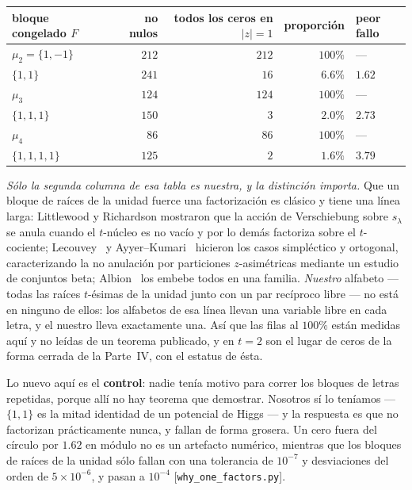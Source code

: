 \documentclass[11pt,a4paper]{article}
\begin{document}
\begin{center}\small
{}
\begin{tabular}{lrrrl}
\toprule
\rowcolor{hdrblue!14}bloque congelado $F$ & no nulos & todos los ceros en $|z|=1$ & proporción &
peor fallo\\
\midrule
$\mu_2=\{1,-1\}$ & $212$ & $212$ & $100\%$ & ---\\
$\{1,1\}$ & $241$ & $16$ & $6.6\%$ & $1.62$\\
$\mu_3$ & $124$ & $124$ & $100\%$ & ---\\
$\{1,1,1\}$ & $150$ & $3$ & $2.0\%$ & $2.73$\\
$\mu_4$ & $86$ & $86$ & $100\%$ & ---\\
$\{1,1,1,1\}$ & $125$ & $2$ & $1.6\%$ & $3.79$\\
\bottomrule
\end{tabular}
\end{center}

\noindent \emph{Sólo la segunda columna de esa tabla es nuestra, y la distinción importa.} Que un
bloque de raíces de la unidad fuerce una factorización es clásico y tiene una línea larga: Littlewood
y Richardson mostraron que la acción de Verschiebung sobre $s_\lambda$ se anula cuando el $t$-núcleo
es no vacío y por lo demás factoriza sobre el $t$-cociente; Lecouvey~\cite{Lecouvey} y
Ayyer--Kumari~\cite{AK} hicieron los casos simpléctico y ortogonal, caracterizando la no anulación
por particiones $z$-asimétricas mediante un estudio de conjuntos beta; Albion~\cite{Albion} los
embebe todos en una familia. \emph{Nuestro} alfabeto --- todas las raíces $t$-ésimas de la unidad
junto con un par recíproco libre --- no está en ninguno de ellos: los alfabetos de esa línea llevan
una variable libre en cada letra, y el nuestro lleva exactamente una. Así que las filas al $100\%$
están medidas aquí y no leídas de un teorema publicado, y en $t=2$ son el lugar de ceros de la forma
cerrada de la Parte~IV, con el estatus de ésta.

Lo nuevo aquí es el \textbf{control}: nadie tenía motivo para correr los bloques de letras repetidas,
porque allí no hay teorema que demostrar. Nosotros sí lo teníamos --- $\{1,1\}$ es la mitad identidad
de un potencial de Higgs --- y la respuesta es que no factorizan prácticamente nunca, y fallan de
forma grosera. Un cero fuera del círculo por $1.62$ en módulo no es un artefacto numérico, mientras
que los bloques de raíces de la unidad sólo fallan con una tolerancia de $10^{-7}$ y desviaciones del
orden de $5\times10^{-6}$, y pasan a $10^{-4}$ [\texttt{why\_one\_factors.py}].
\end{document}
